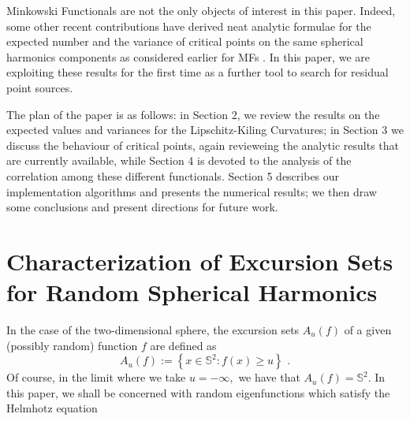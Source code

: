 \documentclass[aps,prd,showpacs,superscriptaddress,groupedaddress]{revtex4-1}  %
\begin{document}
Minkowski Functionals are not the only objects of interest in this paper. Indeed, some other recent contributions have derived neat analytic formulae for the expected number and the variance of critical points on the same spherical harmonics components as considered earlier for MFs \cite{cm1603}. In this paper, we are exploiting these results for the first time as a further tool to search for residual point sources.   


The plan of the paper is as follows: in Section 2, we review the results on the expected values and variances for the Lipschitz-Kiling Curvatures; in Section 3 we discuss the behaviour of critical points, again revieweing the analytic results that are currently available, while Section 4 is devoted to the analysis of the correlation among these different functionals. Section 5 describes our implementation algorithms and presents the numerical results; we then draw some conclusions and present directions for future work.

\section{Characterization of Excursion Sets for Random Spherical Harmonics}

In the case of the two-dimensional sphere, the excursion sets $A_{u}(f)$ of a given (possibly random)
function $f$ are defined as
\begin{equation}
A_{u}(f):=\left\{ x\in \mathbb{S}^{2}:f(x)\geq u\right\} \text{ .}
\end{equation}
Of course, in the limit where we take $u=-\infty ,$ we have that $%
A_{u}(f)=\mathbb{S}^{2}$. In this paper, we shall be concerned with random eigenfunctions which satisfy the Helmhotz equation
\end{document}
